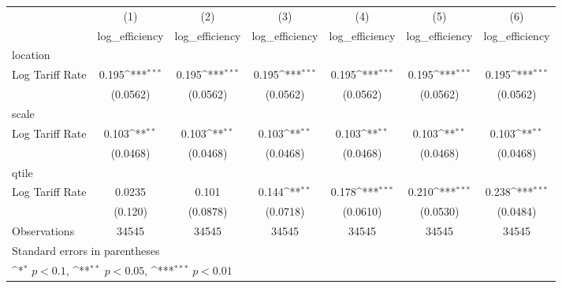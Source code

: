 {
\def\sym#1{\ifmmode^{#1}\else\(^{#1}\)\fi}
\begin{tabular}{l*{6}{c}}
\hline\hline
                    &\multicolumn{1}{c}{(1)}&\multicolumn{1}{c}{(2)}&\multicolumn{1}{c}{(3)}&\multicolumn{1}{c}{(4)}&\multicolumn{1}{c}{(5)}&\multicolumn{1}{c}{(6)}\\
                    &\multicolumn{1}{c}{log\_efficiency}&\multicolumn{1}{c}{log\_efficiency}&\multicolumn{1}{c}{log\_efficiency}&\multicolumn{1}{c}{log\_efficiency}&\multicolumn{1}{c}{log\_efficiency}&\multicolumn{1}{c}{log\_efficiency}\\
\hline
location            &                     &                     &                     &                     &                     &                     \\
Log Tariff Rate     &       0.195\sym{***}&       0.195\sym{***}&       0.195\sym{***}&       0.195\sym{***}&       0.195\sym{***}&       0.195\sym{***}\\
                    &    (0.0562)         &    (0.0562)         &    (0.0562)         &    (0.0562)         &    (0.0562)         &    (0.0562)         \\
\hline
scale               &                     &                     &                     &                     &                     &                     \\
Log Tariff Rate     &       0.103\sym{**} &       0.103\sym{**} &       0.103\sym{**} &       0.103\sym{**} &       0.103\sym{**} &       0.103\sym{**} \\
                    &    (0.0468)         &    (0.0468)         &    (0.0468)         &    (0.0468)         &    (0.0468)         &    (0.0468)         \\
\hline
qtile               &                     &                     &                     &                     &                     &                     \\
Log Tariff Rate     &      0.0235         &       0.101         &       0.144\sym{**} &       0.178\sym{***}&       0.210\sym{***}&       0.238\sym{***}\\
                    &     (0.120)         &    (0.0878)         &    (0.0718)         &    (0.0610)         &    (0.0530)         &    (0.0484)         \\
\hline
Observations        &       34545         &       34545         &       34545         &       34545         &       34545         &       34545         \\
\hline\hline
\multicolumn{7}{l}{\footnotesize Standard errors in parentheses}\\
\multicolumn{7}{l}{\footnotesize \sym{*} \(p<0.1\), \sym{**} \(p<0.05\), \sym{***} \(p<0.01\)}\\
\end{tabular}
}
